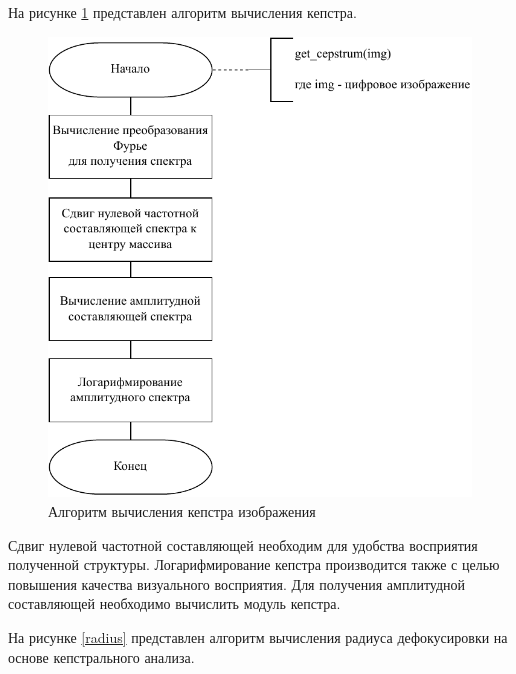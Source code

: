 На рисунке \ref{cepstrum} представлен алгоритм вычисления кепстра.

\begin{figure}[H]
	\centering
	\includegraphics[scale=1]{assets/cepstrum.pdf}
	\caption{Алгоритм вычисления кепстра изображения}
	\label{cepstrum}
\end{figure}

Сдвиг нулевой частотной составляющей необходим для удобства восприятия полученной структуры. Логарифмирование кепстра производится также с целью повышения качества визуального восприятия. Для получения амплитудной составляющей необходимо вычислить модуль кепстра. %

На рисунке \ref{radius} представлен алгоритм вычисления радиуса дефокусировки на основе кепстрального анализа.


